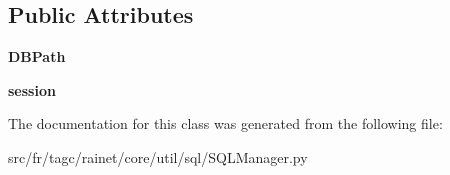 \subsection*{Public Attributes}
\begin{DoxyCompactItemize}
\item 
\hypertarget{classsrc_1_1fr_1_1tagc_1_1rainet_1_1core_1_1util_1_1sql_1_1SQLManager_1_1SQLManager_af568a3ea5d8f2d3e78caedb78f988730}{{\bfseries D\-B\-Path}}\label{classsrc_1_1fr_1_1tagc_1_1rainet_1_1core_1_1util_1_1sql_1_1SQLManager_1_1SQLManager_af568a3ea5d8f2d3e78caedb78f988730}

\item 
\hypertarget{classsrc_1_1fr_1_1tagc_1_1rainet_1_1core_1_1util_1_1sql_1_1SQLManager_1_1SQLManager_ab6927658c071939b1df8c83865237443}{{\bfseries session}}\label{classsrc_1_1fr_1_1tagc_1_1rainet_1_1core_1_1util_1_1sql_1_1SQLManager_1_1SQLManager_ab6927658c071939b1df8c83865237443}

\end{DoxyCompactItemize}


The documentation for this class was generated from the following file\-:\begin{DoxyCompactItemize}
\item 
src/fr/tagc/rainet/core/util/sql/S\-Q\-L\-Manager.\-py\end{DoxyCompactItemize}
